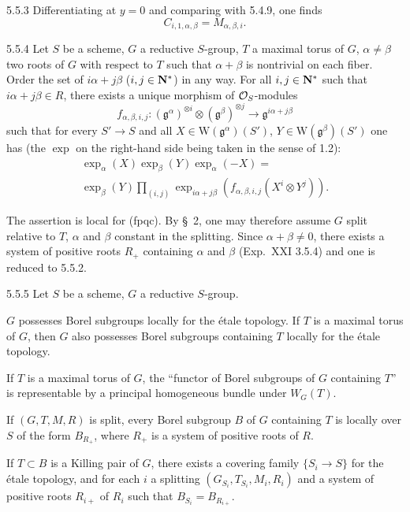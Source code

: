 \begin{remark}{5.5.3}\label{XXII.5.5.3}
Differentiating at $y=0$ and comparing with 5.4.9, one finds
\[
C_{i,1,\alpha,\beta}=M_{\alpha,\beta,i}.
\]
\end{remark}
\begin{corollary}{5.5.4}\label{XXII.5.5.4}
Let $S$ be a scheme, $G$ a reductive $S$-group, $T$ a maximal torus of $G$, $\alpha\ne\beta$ two roots of $G$ with respect to $T$ such that $\alpha+\beta$ is nontrivial on each fiber. Order the set of $i\alpha+j\beta$ ($i,j\in\mathbf{N}^*$) in any way. For all $i,j\in\mathbf{N}^*$ such that $i\alpha+j\beta\in R$, there exists a unique morphism of $\mathcal{O}_S$-modules
\[
f_{\alpha,\beta,i,j}:(\mathfrak g^\alpha)^{\otimes i}\otimes(\mathfrak g^\beta)^{\otimes j}\to\mathfrak g^{i\alpha+j\beta}
\]
such that for every $S'\to S$ and all $X\in\mathrm W(\mathfrak g^\alpha)(S')$, $Y\in\mathrm W(\mathfrak g^\beta)(S')$ one has (the $\exp$ on the right-hand side being taken in the sense of 1.2{\renewcommand{\thefootnote}{(37)}}):
\[
\begin{gathered}
\exp_\alpha(X)\exp_\beta(Y)\exp_\alpha(-X)=\\
\exp_\beta(Y)\prod_{(i,j)}\exp_{i\alpha+j\beta}(f_{\alpha,\beta,i,j}(X^i\otimes Y^j)).
\end{gathered}
\]
\end{corollary}
The assertion is local for (fpqc). By \S~2, one may therefore assume $G$ split relative to $T$, $\alpha$ and $\beta$ constant in the splitting. Since $\alpha+\beta\ne0$, there exists a system of positive roots $R_+$ containing $\alpha$ and $\beta$ (Exp.~XXI 3.5.4) and one is reduced to 5.5.2.
\begin{corollary}{5.5.5}\label{XXII.5.5.5}
Let $S$ be a scheme, $G$ a reductive $S$-group.
\begin{enumeratei}
\item $G$ possesses Borel subgroups locally for the \'etale topology. If $T$ is a maximal torus of $G$, then $G$ also possesses Borel subgroups containing $T$ locally for the \'etale topology.
\item If $T$ is a maximal torus of $G$, the ``functor of Borel subgroups of $G$ containing $T$'' is representable by a principal homogeneous bundle under $W_G(T)$.
\item If $(G,T,M,R)$ is split, every Borel subgroup $B$ of $G$ containing $T$ is locally over $S$ of the form $B_{R_+}$, where $R_+$ is a system of positive roots of $R$.
\item If $T\subset B$ is a Killing pair of $G$, there exists a covering family $\{S_i\to S\}$ for the \'etale topology, and for each $i$ a splitting $(G_{S_i},T_{S_i},M_i,R_i)$ and a system of positive roots $R_{i+}$ of $R_i$ such that $B_{S_i}=B_{R_{i+}}$.
\end{enumeratei}
\end{corollary}
